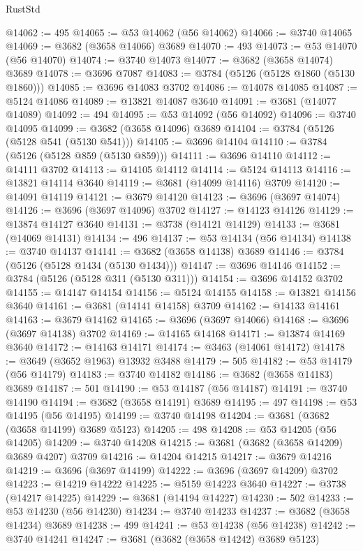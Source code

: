 \begin{lexlean}{RustStd}
\begin{coremodule}
@14062 := 495
@14065 := @53 @14062 (@56 @14062)
@14066 := @3740 @14065
@14069 := @3682 (@3658 @14066) @3689
@14070 := 493
@14073 := @53 @14070 (@56 @14070)
@14074 := @3740 @14073
@14077 := @3682 (@3658 @14074) @3689
@14078 := @3696 @7087
@14083 := @3784 (@5126 (@5128 @1860 (@5130 @1860)))
@14085 := @3696 @14083 @3702
@14086 := @14078 @14085
@14087 := @5124 @14086
@14089 := @13821 @14087 @3640
@14091 := @3681 (@14077 @14089)
@14092 := 494
@14095 := @53 @14092 (@56 @14092)
@14096 := @3740 @14095
@14099 := @3682 (@3658 @14096) @3689
@14104 := @3784 (@5126 (@5128 @541 (@5130 @541)))
@14105 := @3696 @14104
@14110 := @3784 (@5126 (@5128 @859 (@5130 @859)))
@14111 := @3696 @14110
@14112 := @14111 @3702
@14113 := @14105 @14112
@14114 := @5124 @14113
@14116 := @13821 @14114 @3640
@14119 := @3681 (@14099 @14116) @3709
@14120 := @14091 @14119
@14121 := @3679 @14120
@14123 := @3696 (@3697 @14074)
@14126 := @3696 (@3697 @14096) @3702
@14127 := @14123 @14126
@14129 := @13874 @14127 @3640
@14131 := @3738 (@14121 @14129)
@14133 := @3681 (@14069 @14131)
@14134 := 496
@14137 := @53 @14134 (@56 @14134)
@14138 := @3740 @14137
@14141 := @3682 (@3658 @14138) @3689
@14146 := @3784 (@5126 (@5128 @1434 (@5130 @1434)))
@14147 := @3696 @14146
@14152 := @3784 (@5126 (@5128 @311 (@5130 @311)))
@14154 := @3696 @14152 @3702
@14155 := @14147 @14154
@14156 := @5124 @14155
@14158 := @13821 @14156 @3640
@14161 := @3681 (@14141 @14158) @3709
@14162 := @14133 @14161
@14163 := @3679 @14162
@14165 := @3696 (@3697 @14066)
@14168 := @3696 (@3697 @14138) @3702
@14169 := @14165 @14168
@14171 := @13874 @14169 @3640
@14172 := @14163 @14171
@14174 := @3463 (@14061 @14172)
@14178 := @3649 (@3652 @1963) @13932 @3488
@14179 := 505
@14182 := @53 @14179 (@56 @14179)
@14183 := @3740 @14182
@14186 := @3682 (@3658 @14183) @3689
@14187 := 501
@14190 := @53 @14187 (@56 @14187)
@14191 := @3740 @14190
@14194 := @3682 (@3658 @14191) @3689
@14195 := 497
@14198 := @53 @14195 (@56 @14195)
@14199 := @3740 @14198
@14204 := @3681 (@3682 (@3658 @14199) @3689 @5123)
@14205 := 498
@14208 := @53 @14205 (@56 @14205)
@14209 := @3740 @14208
@14215 := @3681 (@3682 (@3658 @14209) @3689 @4207) @3709
@14216 := @14204 @14215
@14217 := @3679 @14216
@14219 := @3696 (@3697 @14199)
@14222 := @3696 (@3697 @14209) @3702
@14223 := @14219 @14222
@14225 := @5159 @14223 @3640
@14227 := @3738 (@14217 @14225)
@14229 := @3681 (@14194 @14227)
@14230 := 502
@14233 := @53 @14230 (@56 @14230)
@14234 := @3740 @14233
@14237 := @3682 (@3658 @14234) @3689
@14238 := 499
@14241 := @53 @14238 (@56 @14238)
@14242 := @3740 @14241
@14247 := @3681 (@3682 (@3658 @14242) @3689 @5123)

\end{coremodule}
\end{lexlean}

